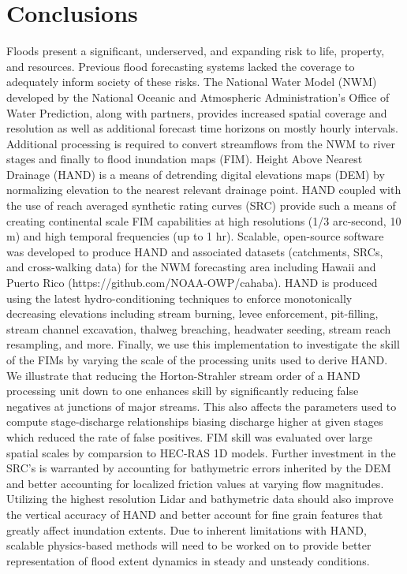 \section{Conclusions}
\label{sec:conclusions}
%
Floods present a significant, underserved, and expanding risk to life, property, and resources.
Previous flood forecasting systems lacked the coverage to adequately inform society of these risks.
The National Water Model (NWM) developed by the National Oceanic and Atmospheric Administration's Office of Water Prediction, along with partners, provides increased spatial coverage and resolution as well as additional forecast time horizons on mostly hourly intervals.
Additional processing is required to convert streamflows from the NWM to river stages and finally to flood inundation maps (FIM).
Height Above Nearest Drainage (HAND) is a means of detrending digital elevations maps (DEM) by normalizing elevation to the nearest relevant drainage point.
HAND coupled with the use of reach averaged synthetic rating curves (SRC) provide such a means of creating continental scale FIM capabilities at high resolutions (1/3 arc-second, 10 m) and high temporal frequencies (up to 1 hr).
Scalable, open-source software was developed to produce HAND and associated datasets (catchments, SRCs, and cross-walking data) for the NWM forecasting area including Hawaii and Puerto Rico (https://github.com/NOAA-OWP/cahaba).
HAND is produced using the latest hydro-conditioning techniques to enforce monotonically decreasing elevations including stream burning, levee enforcement, pit-filling, stream channel excavation, thalweg breaching, headwater seeding, stream reach resampling, and more. 
Finally, we use this implementation to investigate the skill of the FIMs by varying the scale of the processing units used to derive HAND.
We illustrate that reducing the Horton-Strahler stream order of a HAND processing unit down to one enhances skill by significantly reducing false negatives at junctions of major streams.
This also affects the parameters used to compute stage-discharge relationships biasing discharge higher at given stages which reduced the rate of false positives.
FIM skill was evaluated over large spatial scales by comparsion to HEC-RAS 1D models.
Further investment in the SRC's is warranted by accounting for bathymetric errors inherited by the DEM and better accounting for localized friction values at varying flow magnitudes.
Utilizing the highest resolution Lidar and bathymetric data should also improve the vertical accuracy of HAND and better account for fine grain features that greatly affect inundation extents.
Due to inherent limitations with HAND, scalable physics-based methods will need to be worked on to provide better representation of flood extent dynamics in steady and unsteady conditions. 
%
